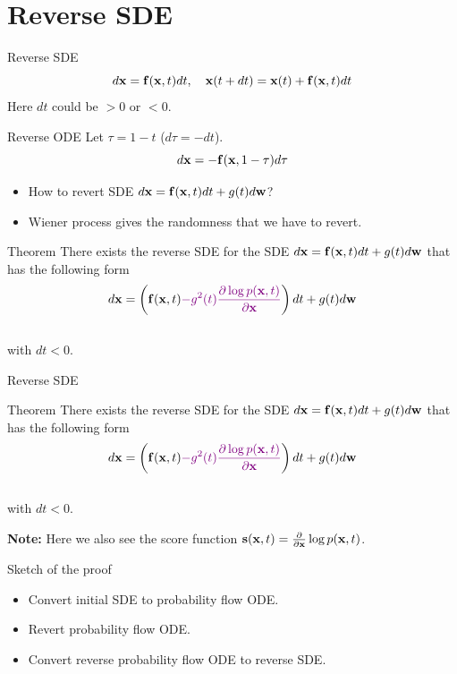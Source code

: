 \section{Reverse SDE}
\begin{frame}{Reverse SDE}
	\vspace{-0.3cm}
	\[
		d\mathbf{x} = \mathbf{f}(\mathbf{x}, t) dt, \quad \mathbf{x}(t + dt) = \mathbf{x}(t) + \mathbf{f}(\mathbf{x}, t) dt
	\]
	Here $dt$ could be $>0$ or $<0$. 
	\begin{block}{Reverse ODE}
		Let $\tau = 1 - t$ ($d\tau = -dt$).
		\vspace{-0.3cm}
		\[
			d\mathbf{x} = - \mathbf{f}(\mathbf{x}, 1 - \tau) d \tau
		\]
	\end{block}
	\vspace{-0.5cm}
	\begin{itemize}
		\item How to revert SDE $d\mathbf{x} = \mathbf{f}(\mathbf{x}, t) dt + g(t) d \mathbf{w}$? 
		\item Wiener process gives the randomness that we have to revert.
	\end{itemize}
	\vspace{-0.3cm}
	\begin{block}{Theorem}
		There exists the reverse SDE for the SDE $d\mathbf{x} = \mathbf{f}(\mathbf{x}, t) dt + g(t) d \mathbf{w}$ that has the following form
		\vspace{-0.3cm}
		\[
			d\mathbf{x} = \left(\mathbf{f}(\mathbf{x}, t) {\color{violet}- g^2(t) \frac{\partial \log p(\mathbf{x}, t)}{\partial \mathbf{x}}}\right) dt + g(t) d \mathbf{w}
		\]
		\vspace{-0.5cm} \\
		with $dt < 0$.
	\end{block}
\end{frame}
\begin{frame}{Reverse SDE}
	\begin{block}{Theorem}
		There exists the reverse SDE for the SDE $d\mathbf{x} = \mathbf{f}(\mathbf{x}, t) dt + g(t) d \mathbf{w}$ that has the following form
		\vspace{-0.3cm}
		\[
			d\mathbf{x} = \left(\mathbf{f}(\mathbf{x}, t) {\color{violet}- g^2(t) \frac{\partial \log p(\mathbf{x}, t)}{\partial \mathbf{x}}}\right) dt + g(t) d \mathbf{w}
		\]
		\vspace{-0.5cm} \\
		with $dt < 0$.
	\end{block}
	\textbf{Note:} Here we also see the score function $\mathbf{s}(\mathbf{x}, t) = \frac{\partial}{\partial \mathbf{x}} \log p(\mathbf{x}, t)$.
	\begin{block}{Sketch of the proof}
		\begin{itemize}
			\item Convert initial SDE to probability flow ODE.
			\item Revert probability flow ODE.
			\item Convert reverse probability flow ODE to reverse SDE.
		\end{itemize}
	\end{block}
\end{frame}
